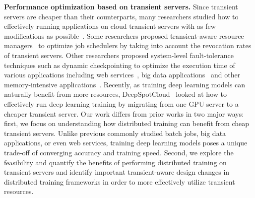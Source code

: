 \textbf{Performance optimization based on transient servers.} Since transient servers are cheaper than their counterparts, many researchers studied how to effectively running applications on cloud transient servers with as few modifications as possible~\cite{hotspot,spotcheck}. Some researchers proposed transient-aware resource managers~\cite{portfolio-driven,proteus} to optimize job schedulers by taking into account the revocation rates of transient servers. Other researchers proposed system-level fault-tolerance techniques such as dynamic checkpointing to optimize the execution time of various applications including web services~\cite{spotcheck,tributary}, big data applications~\cite{See_spotrun,Flint,Tr-spark,spoton} and other memory-intensive applications~\cite{spot_burstable}. Recently, as training deep learning models can naturally benefit from more resources, DeepSpotCloud~\cite{deepspotcloud} looked at how to effectively run deep learning training by migrating from one GPU server to a cheaper transient server. Our work differs from prior works in two major ways: first, we focus on understanding how distributed training can benefit from cheap transient servers. Unlike previous commonly studied batch jobs, big data applications, or even web services, training deep learning models poses a unique trade-off of converging accuracy and training speed. Second, we explore the feasibility and quantify the benefits of performing distributed training on transient servers and identify important transient-aware design changes in distributed training frameworks in order to more effectively utilize transient resources. 
